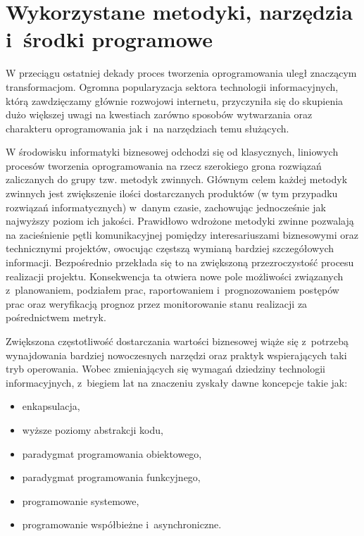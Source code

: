 \section{Wykorzystane metodyki, narzędzia i~środki programowe}\label{ss_internals-technologies}
W przeciągu ostatniej dekady proces tworzenia oprogramowania uległ znaczącym
transformacjom.
Ogromna popularyzacja sektora technologii informacyjnych, którą zawdzięczamy głównie rozwojowi internetu, przyczyniła się do skupienia dużo większej uwagi na kwestiach zarówno sposobów wytwarzania oraz charakteru oprogramowania jak i~na narzędziach temu służących.

W środowisku informatyki biznesowej odchodzi się od klasycznych, liniowych procesów tworzenia oprogramowania na rzecz szerokiego grona rozwiązań zaliczanych do grupy tzw. metodyk zwinnych. 
Głównym celem każdej metodyk zwinnych jest zwiększenie ilości dostarczanych produktów (w tym przypadku rozwiązań informatycznych) w~danym czasie, zachowując jednocześnie jak najwyższy poziom ich jakości.
Prawidłowo wdrożone metodyki zwinne pozwalają na zacieśnienie pętli komunikacyjnej pomiędzy interesariuszami biznesowymi oraz technicznymi projektów, owocując częstszą wymianą bardziej szczegółowych informacji.
Bezpośrednio przekłada się to na zwiększoną przezroczystość procesu realizacji projektu.
Konsekwencja ta otwiera nowe pole możliwości związanych z~planowaniem, podziałem prac, raportowaniem i~prognozowaniem postępów prac oraz weryfikacją prognoz przez monitorowanie stanu realizacji za pośrednictwem metryk.

\par{
Zwiększona częstotliwość dostarczania wartości biznesowej wiąże się z~potrzebą wynajdowania bardziej nowoczesnych narzędzi oraz praktyk wspierających taki tryb operowania.
Wobec zmieniających się wymagań dziedziny technologii informacyjnych, z~biegiem lat na znaczeniu zyskały dawne koncepcje takie jak:

\begin{itemize}
  \item enkapsulacja,
  \item wyższe poziomy abstrakcji kodu,
  \item paradygmat programowania obiektowego,
  \item paradygmat programowania funkcyjnego,
  \item programowanie systemowe,
  \item programowanie współbieżne i~asynchroniczne.
\end{itemize}
}

